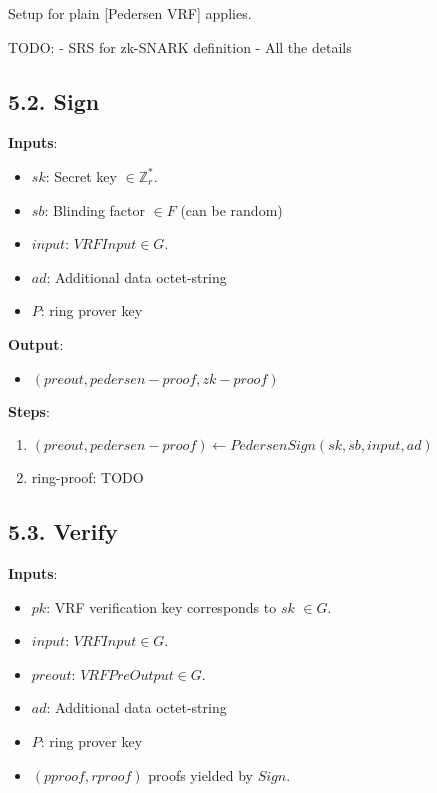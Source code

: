 \documentclass[
]{article}
\providecommand{\tightlist}{%
  \setlength{\itemsep}{0pt}\setlength{\parskip}{0pt}}
\begin{document}
Setup for plain {[}Pedersen VRF{]} applies.

TODO: - SRS for zk-SNARK definition - All the details

\hypertarget{sign-2}{%
\subsection{5.2. Sign}\label{sign-2}}

\textbf{Inputs}:

\begin{itemize}
\tightlist
\item
  \(sk\): Secret key \(\in \mathbb{Z}^*_r\).
\item
  \(sb\): Blinding factor \(\in F\) (can be random)
\item
  \(input\): \(VRFInput \in G\).
\item
  \(ad\): Additional data octet-string
\item
  \(P\): ring prover key
\end{itemize}

\textbf{Output}:

\begin{itemize}
\tightlist
\item
  \((preout, pedersen-proof, zk-proof)\)
\end{itemize}

\textbf{Steps}:

\begin{enumerate}
\def\labelenumi{\arabic{enumi}.}
\tightlist
\item
  \((preout, pedersen-proof) \leftarrow PedersenSign(sk, sb, input, ad)\)
\item
  ring-proof: TODO
\end{enumerate}

\hypertarget{verify-2}{%
\subsection{5.3. Verify}\label{verify-2}}

\textbf{Inputs}:

\begin{itemize}
\tightlist
\item
  \(pk\): VRF verification key corresponds to \(sk\) \(\in G\).
\item
  \(input\): \(VRFInput \in G\).
\item
  \(preout\): \(VRFPreOutput \in G\).
\item
  \(ad\): Additional data octet-string
\item
  \(P\): ring prover key
\item
  \((pproof, rproof)\) proofs yielded by \(Sign\).
\end{itemize}
\end{document}
